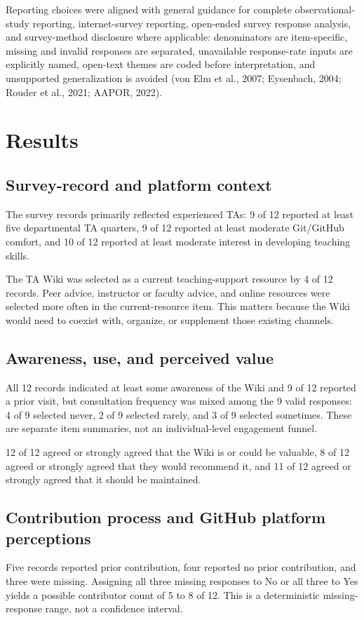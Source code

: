 \documentclass[11pt]{article}
\begin{document}
Reporting choices were aligned with general guidance for complete observational-study reporting, internet-survey reporting, open-ended survey response analysis, and survey-method disclosure where applicable: denominators are item-specific, missing and invalid responses are separated, unavailable response-rate inputs are explicitly named, open-text themes are coded before interpretation, and unsupported generalization is avoided (von Elm et al., 2007; Eysenbach, 2004; Rouder et al., 2021; AAPOR, 2022).

\section{Results}
\subsection{Survey-record and platform context}
The survey records primarily reflected experienced TAs: 9 of 12 reported at least five departmental TA quarters, 9 of 12 reported at least moderate Git/GitHub comfort, and 10 of 12 reported at least moderate interest in developing teaching skills.

The TA Wiki was selected as a current teaching-support resource by 4 of 12 records. Peer advice, instructor or faculty advice, and online resources were selected more often in the current-resource item. This matters because the Wiki would need to coexist with, organize, or supplement those existing channels.

\subsection{Awareness, use, and perceived value}
All 12 records indicated at least some awareness of the Wiki and 9 of 12 reported a prior visit, but consultation frequency was mixed among the 9 valid responses: 4 of 9 selected never, 2 of 9 selected rarely, and 3 of 9 selected sometimes. These are separate item summaries, not an individual-level engagement funnel.

12 of 12 agreed or strongly agreed that the Wiki is or could be valuable, 8 of 12 agreed or strongly agreed that they would recommend it, and 11 of 12 agreed or strongly agreed that it should be maintained.

\subsection{Contribution process and GitHub platform perceptions}
Five records reported prior contribution, four reported no prior contribution, and three were missing. Assigning all three missing responses to No or all three to Yes yields a possible contributor count of 5 to 8 of 12. This is a deterministic missing-response range, not a confidence interval.
\end{document}
